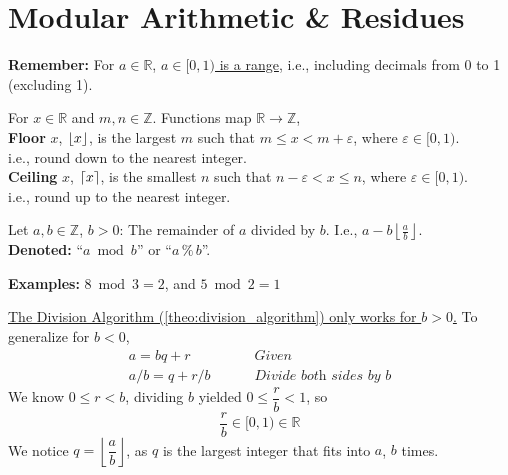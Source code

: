 \section{Modular Arithmetic \& Residues}
\noindent
\textbf{Remember:} For $a\in\mathbb{R}$, \underline {$a\in[0,1)$ is a range}, i.e., including decimals from 0 to 1 (excluding 1).\\
\begin{Def}

    \label{def:floor_ceiling}

    For $x\in\mathbb{R}$ and $m,n\in\mathbb{Z}$. Functions map $\mathbb{R}\rightarrow\mathbb{Z}$,\\

    \noindent
    \textbf{Floor} $x$, $\lfloor x\rfloor$, is the largest $m$ such that $m\leq x<m+\varepsilon$, where $\varepsilon\in[0,1)$.\\
    i.e., round down to the nearest integer.\\

    \vspace{-.5em}
    \noindent
    \textbf{Ceiling} $x$, $\lceil x\rceil$, is the smallest $n$ such that $n-\varepsilon<x\leq n$, where $\varepsilon\in[0,1)$.\\
    i.e., round up to the nearest integer.
\end{Def}
\noindent

\begin{Def}

    \label{def:mod_operator}

    Let $a,b\in\mathbb{Z}$, $b>0$: The remainder of $a$ divided by $b$. I.e., $a-b\left\lfloor\frac{a}{b}\right\rfloor$.\\

    \noindent
    \textbf{Denoted:} ``$a\bmod b$'' or ``$a\,\%\,b$''.
\end{Def}

\noindent
\textbf{Examples:} $8\bmod3=2$, and $5\bmod2=1$\\

\begin{Proof}
    \underline{The Division Algorithm (\ref{theo:division_algorithm}) only works for $b>0$.} To generalize for $b<0$,
    \begin{align*}
        a=bq+r \quad \quad    & \textit{ Given}                    \\
        a/b=q+r/b \quad \quad & \textit{ Divide both sides by $b$}
    \end{align*}
    \noindent
    We know $0\leq r<b$, dividing $b$ yielded $0\leq \dfrac{r}{b}<1$, so
    $$\dfrac{r}{b}\in[0,1)\in\mathbb{R}$$
    We notice $q=\left\lfloor\dfrac{a}{b}\right\rfloor$, as $q$ is the largest integer that fits into $a$, $b$ times.
\end{Proof}

